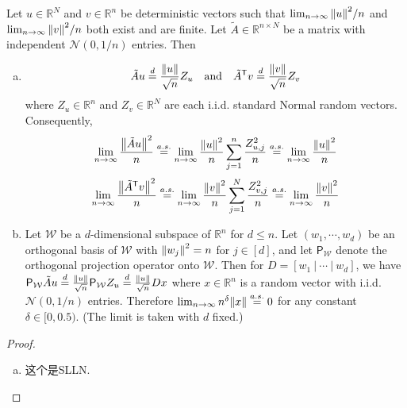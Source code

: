 \documentclass[12pt]{article}
\begin{document}
	\begin{Lemma}
	    Let $u\in\mathbb{R}^N$ and $v\in\mathbb{R}^n$ be deterministic vectors such that $\lim_{n\to\infty}\norm{u}^2/n$ and $\lim_{n\to\infty}\norm{v}^2/n$ both exist and are finite. Let $\tilde{A}\in\mathbb{R}^{n\times N}$ be a matrix with independent $\mathcal{N}(0,1/n)$ entries. Then
	    \begin{enumerate}[(a)]
	        \item \begin{equation}
	            \tilde{A}u\stackrel{d}{=} \frac{\norm{u}}{\sqrt{n}}Z_u~~~\text{and}~~~\tilde{A}^{\mathsf{T}}v\stackrel{d}{=} \frac{\norm{v}}{\sqrt{n}}Z_v
	        \end{equation}
	        where $Z_u\in\mathbb{R}^n$ and $Z_v\in\mathbb{R}^N$ are each i.i.d. standard Normal random vectors. Consequently,
	        \begin{equation}
	            \lim_{n\to\infty} \frac{\norm{\tilde{A}u}^2}{n}\stackrel{a.s.}{=} \lim_{n\to\infty} \frac{\norm{u}^2}{n}\sum_{j = 1}^n \frac{Z_{u,j}^2}{n}\stackrel{a.s.}{=} \lim_{n\to\infty} \frac{\norm{u}^2}{n}
	        \end{equation}
	        \begin{equation}
	            \lim_{n\to\infty} \frac{\norm{\tilde{A}^{\mathsf{T}}v}^2}{n}\stackrel{a.s.}{=} \lim_{n\to\infty} \frac{\norm{v}^2}{n}\sum_{j = 1}^N \frac{Z_{v,j}^2}{n}\stackrel{a.s.}{=} \lim_{n\to\infty} \frac{\norm{v}^2}{n}
	        \end{equation}
	        \item Let $\mathcal{W}$ be a $d$-dimensional subspace of $\mathbb{R}^n$ for $d\leqslant n$. Let $(w_1,\cdots,w_d)$ be an orthogonal basis of $\mathcal{W}$ with $\norm{w_j}^2 = n$ for $j\in[d]$, and let $\mathsf{P}_{\mathcal{W}}$ denote the orthogonal projection operator onto $\mathcal{W}$. Then for $D = \left[ w_1~|~\cdots~|~w_d  \right]$, we have $\mathsf{P}_{\mathcal{W}} \tilde{A}u \stackrel{d}{=}\frac{\norm{u}}{\sqrt{n}}\mathsf{P}_{\mathcal{W}}Z_u\stackrel{d}{=}\frac{\norm{u}}{\sqrt{n}}Dx $ where $x\in\mathbb{R}^n$ is a random vector with i.i.d. $\mathcal{N}(0,1/n)$ entries. Therefore $\lim_{n\to\infty}n^{\delta}\norm{x} \stackrel{a.s.}{=} 0$ for any constant $\delta\in[0,0.5)$. (The limit is taken with $d$ 
	       fixed.) 
	    \end{enumerate}
	\end{Lemma}
	\begin{proof}
	    \begin{enumerate}[(a)]
	        \item 这个是SLLN.
	    \end{enumerate}
	\end{proof}
	
\end{document}

